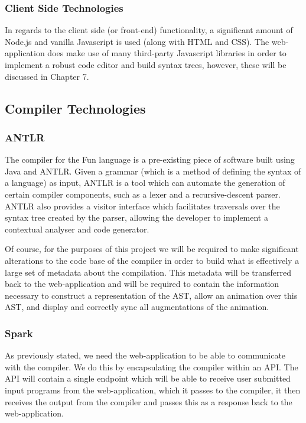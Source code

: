 \documentclass{l4proj}
\begin{document}
\subsubsection{Client Side Technologies}
In regards to the client side (or front-end) functionality, a significant amount of Node.js and vanilla Javascript is used (along with HTML and CSS). The web-application does make use of many third-party Javascript libraries in order to implement a robust code editor and build syntax trees, however, these will be discussed in Chapter 7.
\subsection{Compiler Technologies}
\subsubsection{ANTLR}
The compiler for the Fun language is a pre-existing piece of software built using Java and ANTLR. Given a grammar (which is a method of defining the syntax of a language) as input, ANTLR is a tool which can automate the generation of certain compiler components, such as a lexer and a recursive-descent parser. ANTLR also provides a visitor interface which facilitates traversals over the syntax tree created by the parser, allowing the developer to implement a contextual analyser and code generator. 

Of course, for the purposes of this project we will be required to make significant alterations to the code base of the compiler in order to build what is effectively a large set of metadata about the compilation. This metadata will be transferred back to the web-application and will be required to contain the information necessary to construct a representation of the AST, allow an animation over this AST, and display and correctly sync all augmentations of the animation. 
\subsubsection{Spark}
As previously stated, we need the web-application to be able to communicate with the compiler. We do this by encapsulating the compiler within an API. The API will contain a single endpoint which will be able to receive user submitted input programs from the web-application, which it passes to the compiler, it then receives the output from the compiler and passes this as a response back to the web-application.
\end{document}
